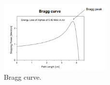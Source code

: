 \documentclass[jmp, amsmath, amssymb, reprint]{article}
\numberwithin{equation}{section}
\newcommand{\lp}{\left(}
\newcommand{\rp}{\right)}
\begin{document}
\begin{multicols}{2}
\begin{figure}[H]
	\centering
  	\includegraphics[width=0.50\textwidth]{bragg.png}
	\caption{Bragg curve.}
	\label{fig:bragg}
\end{figure}



\end{multicols}






%
% 
\end{document}
